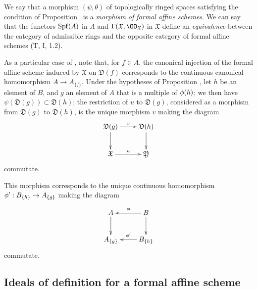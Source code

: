 We say that a morphism $(\psi,\theta)$ of topologically ringed spaces satisfying the condition of Proposition~ is a \emph{morphism of formal affine schemes}.
We can say that the functors $\operatorname{Spf}(A)$ in $A$ and $\Gamma(\mathfrak{X},\OO_\mathfrak{X})$ in $\mathfrak{X}$ define an \emph{equivalence} between the category of admissible rings and the opposite category of formal affine schemes (T, I, 1.2).

\begin{env}[10.2.3]
\label{1.10.2.3}
As a particular case of , note that, for $f\in A$, the canonical injection of the formal affine scheme induced by $\mathfrak{X}$ on $\mathfrak{D}(f)$ corresponds to the continuous canonical homomorphism $A\to A_{\{f\}}$.
Under the hypotheses of Proposition , let $h$ be an element of $B$, and $g$ an element of $A$ that is a multiple of $\phi(h)$;
we then have $\psi(\mathfrak{D}(g))\subset\mathfrak{D}(h)$; the restriction of $u$ to $\mathfrak{D}(g)$, considered as a morphism from $\mathfrak{D}(g)$ to $\mathfrak{D}(h)$, is the unique morphism $v$ making the diagram
\[
  \xymatrix{
    \mathfrak{D}(g)\ar[r]^v\ar[d] &
    \mathfrak{D}(h)\ar[d]\\
    \mathfrak{X}\ar[r]^u &
    \mathfrak{Y}
  }
\]
commutate.

This morphism corresponds to the unique continuous homomorphism $\vphi':B_{\{h\}}\to A_{\{g\}}$  making the diagram
\[
  \xymatrix{
    A\ar[d] &
    B\ar[l]_\vphi\ar[d]\\
    A_{\{g\}} &
    B_{\{h\}}\ar[l]_{\vphi'}
  }
\]
commutate.
\end{env}

\subsection{Ideals of definition for a formal affine scheme}
\label{subsection:1.10.3}

